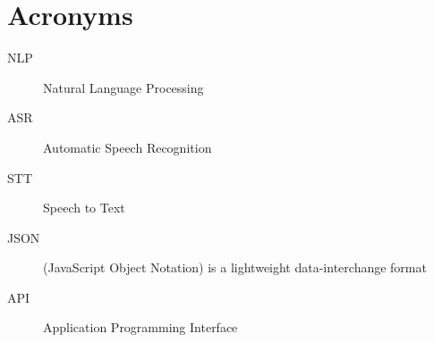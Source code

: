 
\chapter{Acronyms}
\begin{description}
	\item[NLP] Natural Language Processing
	\item[ASR] Automatic Speech Recognition
	\item[STT] Speech to Text
	\item[JSON] (JavaScript Object Notation) is a lightweight data-interchange format
	\item[API] Application Programming Interface
\end{description}